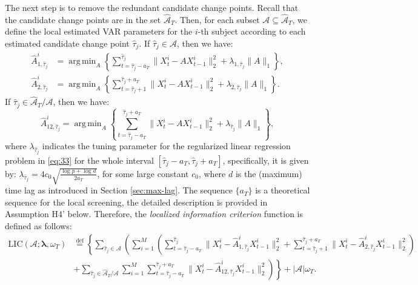 \documentclass[11pt]{article}
\DeclareMathOperator*{\argmin}{arg\,min}
\begin{document}
The next step is to remove the redundant candidate change points. Recall that the candidate change points are in the set $\widehat{\mathcal{A}}_T$. Then, for each subset $\mathcal{A} \subseteq \widehat{\mathcal{A}}_T$, we define the local estimated VAR parameters for the $i$-th subject according to each estimated candidate change point $\widehat{\tau}_j$. If $\widehat{\tau}_j \in \mathcal{A}$, then we have:
\begin{equation}
    \label{eq:32}
    \begin{aligned}
        \widehat{A}_{1,\widehat{\tau}_j}^i &= \argmin_{A}\left\{ \sum_{t=\widehat{\tau}_j - a_T}^{\widehat{\tau}_j}\|X_t^i - AX_{t-1}^i\|_2^2 + \lambda_{1,\widehat{\tau}_j}\|A\|_1 \right\}, \\
        \widehat{A}_{2,\widehat{\tau}_j}^i &= \argmin_A\left\{ \sum_{t=\widehat{\tau}_j+1}^{\widehat{\tau}_j+a_T}\|X_t^i - AX_{t-1}^i\|_2^2 + \lambda_{2,\widehat{\tau}_j}\|A\|_1 \right\}.
    \end{aligned}
\end{equation}
If $\widehat{\tau}_j \in \widehat{\mathcal{A}}_T \slash \mathcal{A}$, then we have:
\begin{equation}
    \label{eq:33}
    \widehat{A}_{12,\widehat{\tau}_j}^i = \argmin_A\left\{ \sum_{t=\widehat{\tau}_j-a_T}^{\widehat{\tau}_j+a_T}\|X_t^i - AX_{t-1}^i\|_2^2 + \lambda_{\widehat{\tau}_j}\|A\|_1 \right\},
\end{equation}
where $\lambda_{\widehat{\tau}_j}$ indicates the tuning parameter for the regularized linear regression problem in \eqref{eq:33} for the whole interval $[\widehat{\tau}_j - a_T, \widehat{\tau}_j + a_T]$, specifically, it is given by: $\lambda_{\widehat{\tau}_j} = 4c_0\sqrt{\frac{\log p + \log d}{2a_T}}$, for some large constant $c_0$, where $d$ is the (maximum) time lag as introduced in Section \ref{sec:max-lag}. The sequence $\{a_T\}$ is a theoretical sequence for the local screening, the detailed description is provided in Assumption H4' below. Therefore, the \emph{localized information criterion} function is defined as follows:
\begin{equation}
    \label{eq:34}
    \begin{aligned}
        \text{LIC}(\mathcal{A}; \bm{\lambda}, \omega_T) &\overset{\text{def}}{=} \left\{ \sum_{\widehat{\tau}_j \in \mathcal{A}}\left( \sum_{i=1}^M\left(\sum_{t=\widehat{\tau}_j-a_T}^{\widehat{\tau}_j}\|X_t^i - \widehat{A}_{1,\widehat{\tau}_j}^iX_{t-1}^i\|_2^2 + \sum_{t=\widehat{\tau}_j+1}^{\widehat{\tau}_j+a_T}\|X_t^i - \widehat{A}_{2,\widehat{\tau}_j}^iX_{t-1}^i\|_2^2 \right) \right.\right. \\
        &+ \left.\left. \sum_{\widehat{\tau}_j \in \widehat{\mathcal{A}}_T \slash \mathcal{A}}\sum_{i=1}^M\sum_{t=\widehat{\tau}_j-a_T}^{\widehat{\tau}_j+a_T}\|X_t^i - \widehat{A}_{12,\widehat{\tau}_j}^iX_{t-1}^i\|_2^2 \right) \right\} + |\mathcal{A}|\omega_T.
    \end{aligned}
\end{equation}
\end{document}
